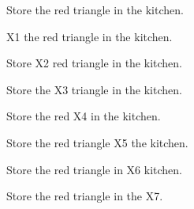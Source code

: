 Store the red triangle in the kitchen.

X1 the red triangle in the kitchen.

Store X2 red triangle in the kitchen.

Store the X3 triangle in the kitchen.

Store the red X4 in the kitchen.

Store the red triangle X5 the kitchen.

Store the red triangle in X6 kitchen.

Store the red triangle in the X7.



